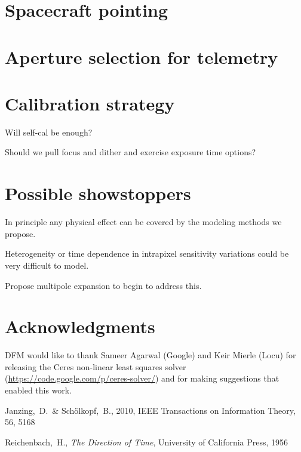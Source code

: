 \documentclass[letterpaper,12pt,preprint]{aastex}
\begin{document}
\section{Spacecraft pointing}\label{sec:pointing}

\section{Aperture selection for telemetry}\label{sec:telemetry}

\section{Calibration strategy}\label{sec:calibration}

Will self-cal be enough?

Should we pull focus and dither and exercise exposure time options?

\section{Possible showstoppers}\label{sec:stop}

In principle any physical effect can be covered by the modeling
methods we propose.

Heterogeneity or time dependence in intrapixel sensitivity variations
could be very difficult to model.

Propose multipole expansion to begin to address this.

\section{Acknowledgments}

DFM would like to thank Sameer Agarwal (Google) and Keir Mierle (Locu) for
releasing the Ceres non-linear least squares solver
(\url{https://code.google.com/p/ceres-solver/}) and for making suggestions
that enabled this work.

\begin{thebibliography}{}\raggedright%

Janzing,~D.\ \& Sch{\"o}lkopf,~B., 2010, IEEE Transactions on Information
Theory, 56, 5168

Reichenbach,~H., \emph{The Direction of Time}, University of California
Press, 1956

\end{thebibliography}
\end{document}
